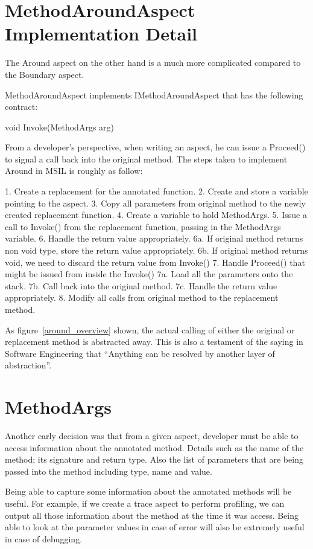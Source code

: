 \section{MethodAroundAspect Implementation Detail}

The Around aspect on the other hand is a much more complicated compared to the Boundary aspect.

MethodAroundAspect implements IMethodAroundAspect that has the following contract:

void Invoke(MethodArgs arg)

From a developer’s perspective, when writing an aspect, he can issue a Proceed() to signal a call back into the original method. The steps taken to implement Around in MSIL is roughly as follow:

1. Create a replacement for the annotated function.
2. Create and store a variable pointing to the aspect.
3. Copy all parameters from original method to the newly created replacement function.
4. Create a variable to hold MethodArgs.
5. Issue a call to Invoke() from the replacement function, passing in the MethodArgs variable.
6. Handle the return value appropriately.
   6a. If original method returns non void type, store the return value appropriately.
   6b. If original method returns void, we need to discard the return value from Invoke()
7. Handle Proceed() that might be issued from inside the Invoke()
   7a. Load all the parameters onto the stack.
   7b. Call back into the original method.
   7c. Handle the return value appropriately.
8. Modify all calls from original method to the replacement method.

As figure~\ref{around_overview} shown, the actual calling of either the original or replacement method is abstracted away. This is also a testament of the saying in Software Engineering that “Anything can be resolved by another layer of abstraction”.

\section{MethodArgs}

Another early decision was that from a given aspect, developer must be able to access information about the annotated method. Details such as the name of the method; its signature and return type. Also the list of parameters that are being passed into the method including type, name and value.

Being able to capture some information about the annotated methods will be useful. For example, if we create a trace aspect to perform profiling, we can output all those information about the method at the time it was access. Being able to look at the parameter values in case of error will also be extremely useful in case of debugging.

